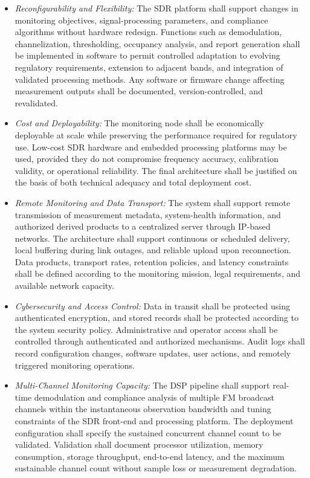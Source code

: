 \documentclass[11pt]{report}
\begin{document}
\begin{itemize}[label=--]
	
	\item
	\textit{Reconfigurability and Flexibility:}
	The SDR platform shall support changes in monitoring objectives, signal-processing parameters, and compliance algorithms without hardware redesign. Functions such as demodulation, channelization, thresholding, occupancy analysis, and report generation shall be implemented in software to permit controlled adaptation to evolving regulatory requirements, extension to adjacent bands, and integration of validated processing methods. Any software or firmware change affecting measurement outputs shall be documented, version-controlled, and revalidated.
	
	\item
	\textit{Cost and Deployability:}
	The monitoring node shall be economically deployable at scale while preserving the performance required for regulatory use. Low-cost SDR hardware and embedded processing platforms may be used, provided they do not compromise frequency accuracy, calibration validity, or operational reliability. The final architecture shall be justified on the basis of both technical adequacy and total deployment cost.
	
	\item
	\textit{Remote Monitoring and Data Transport:}
	The system shall support remote transmission of measurement metadata, system-health information, and authorized derived products to a centralized server through IP-based networks. The architecture shall support continuous or scheduled delivery, local buffering during link outages, and reliable upload upon reconnection. Data products, transport rates, retention policies, and latency constraints shall be defined according to the monitoring mission, legal requirements, and available network capacity.
	
	\item
	\textit{Cybersecurity and Access Control:}
	Data in transit shall be protected using authenticated encryption, and stored records shall be protected according to the system security policy. Administrative and operator access shall be controlled through authenticated and authorized mechanisms. Audit logs shall record configuration changes, software updates, user actions, and remotely triggered monitoring operations.
	
	\item
	\textit{Multi-Channel Monitoring Capacity:}
	The DSP pipeline shall support real-time demodulation and compliance analysis of multiple FM broadcast channels within the instantaneous observation bandwidth and tuning constraints of the SDR front-end and processing platform. The deployment configuration shall specify the sustained concurrent channel count to be validated. Validation shall document processor utilization, memory consumption, storage throughput, end-to-end latency, and the maximum sustainable channel count without sample loss or measurement degradation.
	

\end{itemize}
\end{document}
